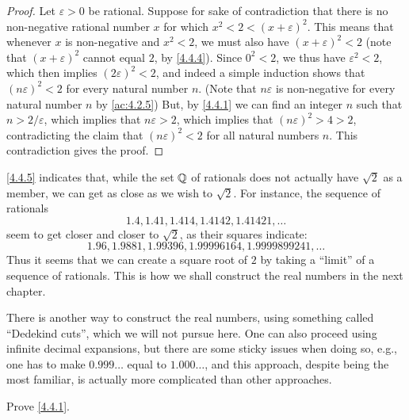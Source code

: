 \begin{proof}
  Let \(\varepsilon > 0\) be rational.
  Suppose for sake of contradiction that there is no non-negative rational number \(x\) for which \(x^2 < 2 < (x + \varepsilon)^2\).
  This means that whenever \(x\) is non-negative and \(x^2 < 2\), we must also have \((x + \varepsilon)^2 < 2\)
  (note that \((x + \varepsilon)^2\) cannot equal \(2\), by \cref{4.4.4}).
  Since \(0^2 < 2\), we thus have \(\varepsilon^2 < 2\), which then implies \((2\varepsilon)^2 < 2\), and indeed a simple induction shows that \((n\varepsilon)^2 < 2\) for every natural number \(n\).
  (Note that \(n\varepsilon\) is non-negative for every natural number \(n\) by \cref{ac:4.2.5})
  But, by \cref{4.4.1} we can find an integer \(n\) such that \(n > 2 / \varepsilon\), which implies that \(n\varepsilon > 2\), which implies that \((n\varepsilon)^2 > 4 > 2\), contradicting the claim that \((n\varepsilon)^2 < 2\) for all natural numbers \(n\).
  This contradiction gives the proof.
\end{proof}

\begin{note}
  \cref{4.4.5} indicates that, while the set \(\mathbb{Q}\) of rationals does not actually have \(\sqrt{2}\) as a member, we can get as close as we wish to \(\sqrt{2}\).
  For instance, the sequence of rationals
  \[
    1.4, 1.41, 1.414, 1.4142, 1.41421, \dots
  \]
  seem to get closer and closer to \(\sqrt{2}\), as their squares indicate:
  \[
    1.96, 1.9881, 1.99396, 1.99996164, 1.9999899241, \dots
  \]
  Thus it seems that we can create a square root of \(2\) by taking a ``limit'' of a sequence of rationals.
  This is how we shall construct the real numbers in the next chapter.
\end{note}

\begin{note}
  There is another way to construct the real numbers, using something called ``Dedekind cuts'', which we will not pursue here.
  One can also proceed using infinite decimal expansions, but there are some sticky issues when doing so, e.g., one has to make \(0.999\dots\) equal to \(1.000\dots\), and this approach, despite being the most familiar, is actually more complicated than other approaches.
\end{note}

\exercisesection

\begin{ex}\label{ex:4.4.1}
  Prove \cref{4.4.1}.
\end{ex}

